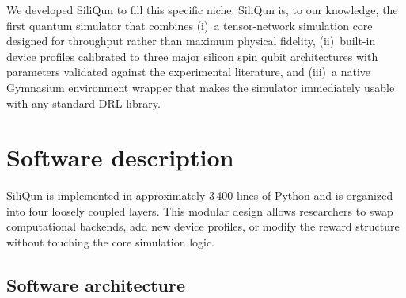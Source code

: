 \documentclass[preprint,12pt, a4paper]{elsarticle}
\begin{document}
\begin{table}[htbp]
\centering
\caption{Comparison of SiliQun with existing quantum simulation tools.}
\label{tab:comparison}
\end{table}

We developed SiliQun to fill this specific niche. SiliQun is, to our knowledge, the first quantum simulator that combines (i)~a tensor-network simulation core designed for throughput rather than maximum physical fidelity, (ii)~built-in device profiles calibrated to three major silicon spin qubit architectures with parameters validated against the experimental literature, and (iii)~a native Gymnasium environment wrapper that makes the simulator immediately usable with any standard DRL library.

\section{Software description}
\label{sec:description}

SiliQun is implemented in approximately 3\,400 lines of Python and is organized into four loosely coupled layers. This modular design allows researchers to swap computational backends, add new device profiles, or modify the reward structure without touching the core simulation logic.

\subsection{Software architecture}
\end{document}

